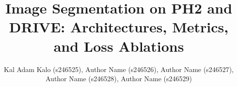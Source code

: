 \documentclass[10pt,twocolumn,letterpaper]{article}
\title{Image Segmentation on PH2 and DRIVE: Architectures, Metrics, and Loss Ablations}
\author{
\parbox{0.8\textwidth}{\centering
Kal Adam Kalo (s246525), Author Name (s246526), Author Name (s246527),
Author Name (s246528), Author Name (s246529)
}
}
\begin{document}
\maketitle






\clearpage
{
    \small
    
    
}

\end{document}
